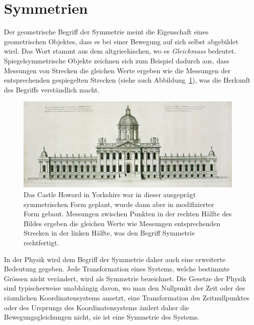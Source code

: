 %
%
%
\section{Symmetrien
\label{buch:section:symmetrien}}
Der geometrische Begriff der Symmetrie meint die Eigenschaft eines
geometrischen Objektes, dass es bei einer Bewegung auf sich selbst
abgebildet wird.
Das Wort stammt aus dem altgriechischen, wo es {\em Gleichmass}
bedeutet.
Spiegelsymmetrische Objekte zeichnen sich zum Beispiel dadurch aus,
dass Messungen von Strecken die gleichen Werte ergeben wie die Messungen
der entsprechenden gespiegelten Strecken (siehe auch
Abbildung~\ref{buch:lie:bild:castlehoward}), was die Herkunft des
Begriffs verständlich macht.
\begin{figure}
\centering
\includegraphics[width=\textwidth]{chapters/60-gruppen/images/castle.jpeg}
\caption{Das Castle Howard in Yorkshire war in dieser ausgeprägt symmetrischen
Form geplant, wurde dann aber in modifizierter Form gebaut.
Messungen zwischen Punkten in der rechten Hälfte des Bildes
ergeben die gleichen Werte wie Messungen entsprechenden Strecken
in der linken Hälfte, was den Begriff Symmetrie rechtfertigt.
\label{buch:lie:bild:castlehoward}}
\end{figure}
In der Physik wird dem Begriff der Symmetrie daher auch eine erweiterte
Bedeutung gegeben.
Jede Transformation eines Systems, welche bestimmte Grössen nicht
verändert, wird als Symmetrie bezeichnet.
Die Gesetze der Physik sind typischerweise unabhängig davon, wo man
den Nullpunkt der Zeit oder des räumlichen Koordinatensystems ansetzt,
eine Transformation des Zeitnullpunktes oder des Ursprungs des
Koordinatensystems ändert daher die Bewegungsgleichungen nicht, sie ist
eine Symmetrie des Systems.

